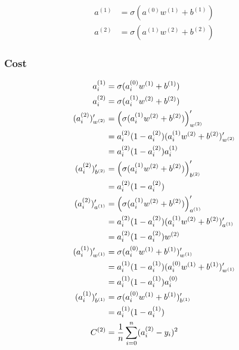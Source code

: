 \documentclass{article}
\begin{document}
\begin{align}
    a^{(1)} & = \sigma(a^{(0)}w^{(1)} + b^{(1)}) \\
    a^{(2)} & = \sigma(a^{(1)}w^{(2)} + b^{(2)})
\end{align}

\subsubsection{Cost}
\begin{align}
    a_i^{(1)}              & = \sigma(a_i^{(0)}w^{(1)} + b^{(1)})                                \\
    a_i^{(2)}              & = \sigma(a_i^{(1)}w^{(2)} + b^{(2)})                                \\
    (a_i^{(2)})'_{w^{(2)}} & = \left(\sigma(a_i^{(1)}w^{(2)} + b^{(2)})\right)'_{w^{(2)}}        \\
                           & = a_i^{(2)} (1 - a_i^{(2)}) (a_i^{(1)}w^{(2)} + b^{(2)})'_{w^{(2)}} \\
                           & = a_i^{(2)} (1 - a_i^{(2)}) a_i^{(1)}                               \\
    (a_i^{(2)})'_{b^{(2)}} & = \left(\sigma(a_i^{(1)}w^{(2)} + b^{(2)})\right)'_{b^{(2)}}        \\
                           & = a_i^{(2)} (1 - a_i^{(2)})                                         \\
    (a_i^{(2)})'_{a^{(1)}} & = \left(\sigma(a_i^{(1)}w^{(2)} + b^{(2)})\right)'_{a^{(1)}}        \\
                           & = a_i^{(2)} (1 - a_i^{(2)})(a_i^{(1)}w^{(2)} + b^{(2)})'_{a^{(1)}}  \\
                           & = a_i^{(2)} (1 - a_i^{(2)})w^{(2)}                                  \\
    (a^{(1)}_i)'_{w^{(1)}} & = \sigma(a_i^{(0)}w^{(1)} + b^{(1)})'_{w^{(1)}}                     \\
                           & = a^{(1)}_i(1 - a^{(1)}_i)(a_i^{(0)}w^{(1)} + b^{(1)})'_{w^{(1)}}   \\
                           & = a^{(1)}_i(1 - a^{(1)}_i)a_i^{(0)}                                 \\
    (a^{(1)}_i)'_{b^{(1)}} & = \sigma(a_i^{(0)}w^{(1)} + b^{(1)})'_{b^{(1)}}                     \\
                           & = a^{(1)}_i(1 - a^{(1)}_i)                                          \\
    C^{(2)}                & = \asum[i, n] (a_i^{(2)} - y_i)^2
\end{align}
\end{document}

